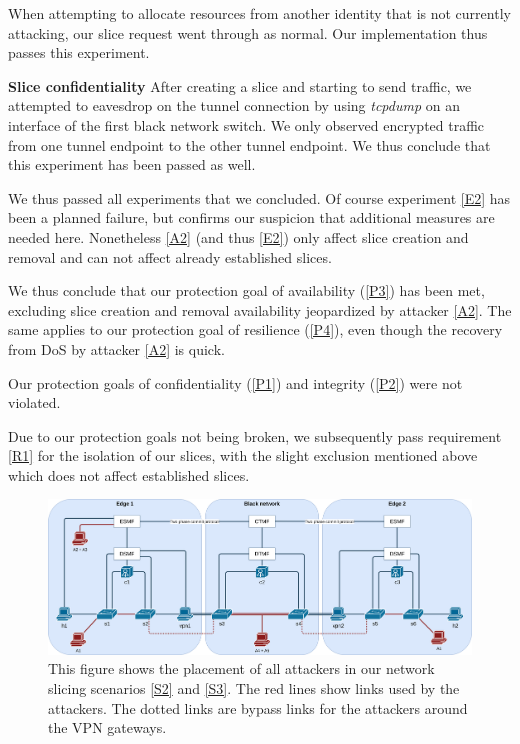 \begin{description}[style=multiline, labelwidth=0.7cm]
   When attempting to allocate resources from another identity that is not currently attacking, our slice request went through as normal. Our implementation thus passes this experiment.

   \item[\ref{E4}] \textbf{Slice confidentiality} After creating a slice and starting to send traffic, we attempted to eavesdrop on the tunnel connection by using \textit{tcpdump} on an interface of the first black network switch. We only observed encrypted traffic from one tunnel endpoint to the other tunnel endpoint. We thus conclude that this experiment has been passed as well.
\end{description}

We thus passed all experiments that we concluded. Of course experiment \ref{E2} has been a planned failure, but confirms our suspicion that additional measures are needed here. Nonetheless \ref{A2} (and thus \ref{E2}) only affect slice creation and removal and can not affect already established slices.

We thus conclude that our protection goal of availability (\ref{P3}) has been met, excluding slice creation and removal availability jeopardized by attacker \ref{A2}. The same applies to our protection goal of resilience (\ref{P4}), even though the recovery from DoS by attacker \ref{A2} is quick.

Our protection goals of confidentiality (\ref{P1}) and integrity (\ref{P2}) were not violated.

Due to our protection goals not being broken, we subsequently pass requirement \ref{R1} for the isolation of our slices, with the slight exclusion mentioned above which does not affect established slices.

\begin{landscape}
    \begin{figure}[ht]
        \centering
        \includegraphics[width=\linewidth]{images/chapter_7/attackers_topo.png}
        \caption[Placement of attackers in scenario S2 and S3]{This figure shows the placement of all attackers in our network slicing scenarios \ref{S2} and \ref{S3}. The red lines show links used by the attackers. The dotted links are bypass links for the attackers around the VPN gateways.}
        \label{fig:attackers_topo}
    \end{figure}
\end{landscape}

